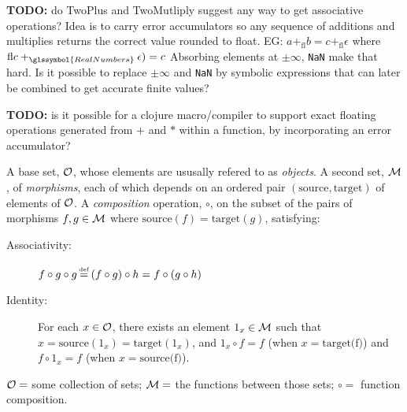 \textbf{TODO:} do TwoPlus and TwoMutliply 
suggest any way to get associative operations?
Idea is to carry error accumulators so 
any sequence of additions and multiplies 
returns the correct  value rounded to float.
EG: $ a +_{\text{fl}} b = c +_{\text{fl}} \epsilon$
where $\text{fl} c +_{\glssymbol{RealNumbers}} \epsilon) = c$
Absorbing elements at $\pm\infty$, \texttt{NaN} make that hard.
Is it possible to replace $\pm\infty$ and \texttt{NaN}
by symbolic expressions that can later be combined to get 
accurate finite values?


\textbf{TODO:} is it possible for a clojure macro/compiler
to support exact floating operations generated from
$+$ and $*$ within a function, by incorporating an error
accumulator?


A base set, ${\mathcal{O}}$, 
whose elements are ususally refered to as \textit{objects}.
A second set, ${\mathcal{M}}$, of \textit{morphisms}, 
each of which depends on an ordered pair 
$\left( \text{source} , \text{target} \right)$ of elements of 
${\mathcal{O}}$. 
A \textit{composition} operation, $\circ$, on 
the subset of the pairs of morphisms $f , g \in {\mathcal{M}}$
where $\text{source}(f) = \text{target}(g)$, satisfying:
\begin{description}
\item[Associativity:] $f \circ g \circ g \operatorname*{\overset{\underset{\mathrm{def}}{}}{=}} 
\left( f \circ g \right) \circ h 
= f \circ \left( g \circ h \right)$
\item[Identity:] For each $x \in {\mathcal{O}}$, there exists an element
$1_x \in {\mathcal{M}}$ such that 
$x = \text{source}(1_x) = \text{target}(1_x)$, and 
$1_x \circ f = f$ (when $x = \text{target(f)}$) and
$f \circ 1_x = f$ (when $x = \text{source(f)}$).
\end{description}

 \begin{example}
 ${\mathcal{O}} = $ some collection of sets;
 ${\mathcal{M}} = $ the functions between those sets;
 $\circ = $ function composition.  
 \end{example}
 